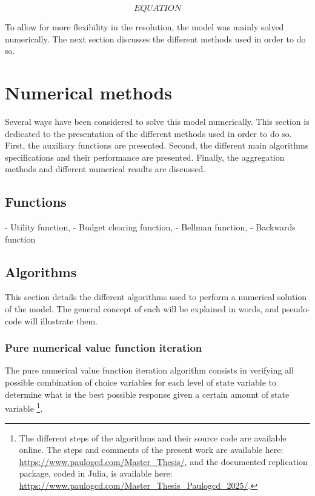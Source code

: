 \documentclass{article}
\begin{document}
$$EQUATION$$

To allow for more flexibility in the resolution, the model was mainly solved
numerically.
The next section discusses the different methods used in order to do so.

\section{Numerical methods}

Several ways have been considered to solve this model numerically. 
This section is dedicated to the presentation of the different methods
used in order to do so. 
First, the auxiliary functions are presented. 
Second, the different main algorithms specifications and their performance are presented. 
Finally, the aggregation methods and different numerical results are discussed.

\subsection{Functions}

- Utility function, 
- Budget clearing function, 
- Bellman function, 
- Backwards function

\subsection{Algorithms}

This section details the different algorithms used to perform a numerical 
solution of the model. 
The general concept of each will be explained in words, and 
pseudo-code will illustrate them.

\subsubsection{Pure numerical value function iteration}

The pure numerical value function iteration algorithm consists
in verifying all possible 
combination of choice variables for each level of state variable 
to determine what is the best possible response given a certain
amount of state variable \footnote{The different steps of the algorithms and their source code are available online.
The steps and comments of the present work are available here: \url{https://www.paulogcd.com/Master_Thesis/},
and the documented replication package, coded in Julia, is available here: \url{https://www.paulogcd.com/Master_Thesis_Paulogcd_2025/}.}.
\end{document}
